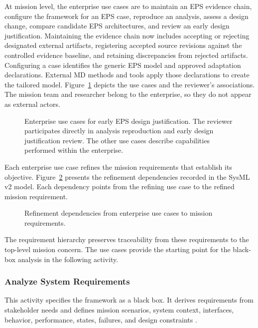 \documentclass[11pt,a4paper]{article}
\begin{document}
At mission level, the enterprise use cases are to maintain an EPS evidence chain, configure the framework for an EPS case, reproduce an analysis, assess a design change, compare candidate EPS architectures, and review an early design justification. Maintaining the evidence chain now includes accepting or rejecting designated external artifacts, registering accepted source revisions against the controlled evidence baseline, and retaining discrepancies from rejected artifacts. Configuring a case identifies the generic EPS model and approved adaptation declarations. External MD methods and tools apply those declarations to create the tailored model. Figure~\ref{fig:enterprise-use-cases} depicts the use cases and the reviewer's associations. The mission team and researcher belong to the enterprise, so they do not appear as external actors.

\begin{figure}[htbp]
    \centering
    \resizebox{\linewidth}{!}{}
    \caption{Enterprise use cases for early EPS design justification. The reviewer participates directly in analysis reproduction and early design justification review. The other use cases describe capabilities performed within the enterprise.}
    \label{fig:enterprise-use-cases}
\end{figure}

Each enterprise use case refines the mission requirements that establish its objective. Figure~\ref{fig:enterprise-use-case-refinements} presents the refinement dependencies recorded in the SysML v2 model. Each dependency points from the refining use case to the refined mission requirement.

\begin{figure}[htbp]
    \centering
    \resizebox{\linewidth}{!}{}
    \caption{Refinement dependencies from enterprise use cases to mission requirements.}
    \label{fig:enterprise-use-case-refinements}
\end{figure}

The requirement hierarchy preserves traceability from these requirements to the top-level mission concern. The use cases provide the starting point for the black-box analysis in the following activity.

\subsubsection{Analyze System Requirements}
This activity specifies the framework as a black box. It derives requirements from stakeholder needs and defines mission scenarios, system context, interfaces, behavior, performance, states, failures, and design constraints \cite{friedenthal2014practical}.
\end{document}
